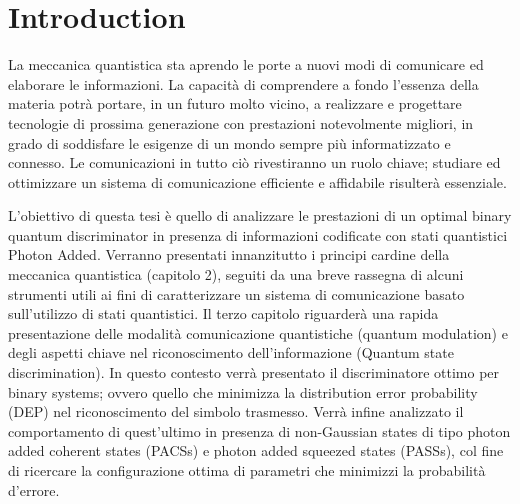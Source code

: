 
\chapter{Introduction}
    La meccanica quantistica sta aprendo le porte a nuovi modi di comunicare ed elaborare le 
    informazioni. La capacità di comprendere a fondo l'essenza della materia potrà portare, 
    in un futuro molto vicino, a realizzare e progettare tecnologie di prossima generazione
    con prestazioni notevolmente migliori, in grado di soddisfare le esigenze di un mondo sempre
    più informatizzato e connesso.
    Le comunicazioni in tutto ciò rivestiranno un ruolo chiave; studiare ed ottimizzare un sistema
    di comunicazione efficiente e affidabile risulterà essenziale.

    L'obiettivo di questa tesi è quello di analizzare le prestazioni di un optimal binary quantum discriminator 
    in presenza di informazioni codificate con stati quantistici Photon Added. 
    Verranno presentati innanzitutto i principi cardine della meccanica quantistica (capitolo 2), 
    seguiti da una breve rassegna di alcuni strumenti utili ai fini di 
    caratterizzare un sistema di comunicazione basato sull'utilizzo di stati quantistici.
    Il terzo capitolo riguarderà una rapida presentazione delle modalità comunicazione quantistiche (quantum modulation)
    e degli aspetti chiave nel riconoscimento dell'informazione (Quantum state discrimination). In questo contesto 
    verrà presentato il discriminatore ottimo per binary systems; ovvero quello che minimizza la distribution error
    probability (DEP) nel riconoscimento del simbolo trasmesso. 
    Verrà infine analizzato il comportamento di quest'ultimo in presenza di non-Gaussian states di tipo photon
    added coherent states (PACSs) e photon added squeezed states (PASSs), col fine di ricercare la configurazione
    ottima di parametri che minimizzi la probabilità d'errore.